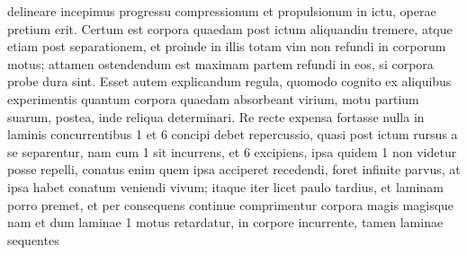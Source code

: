 %
delineare incepimus progressu compressionum et propulsionum in ictu,%
\protect{} operae pretium erit.%
%
Certum est corpora quaedam post ictum%
\protect{} aliquandiu tremere, atque etiam 
%
%
 post separationem,%
\protect{} et proinde in illis totam vim%
\protect{} non refundi in corporum motus; attamen ostendendum est maximam  
%
partem refundi in eos, si corpora probe dura%
\protect{} sint. Esset autem explicandum 
%
regula, quomodo cognito ex aliquibus experimentis%
\protect{} quantum corpora  
%
quaedam absorbeant virium,%
\protect{} motu partium%
\protect{} suarum, postea, inde reliqua 
%
%
 determinari. 
\pend
%
\pstart Re recte expensa fortasse nulla in laminis\protect{} 
%
concurrentibus 1 et 6
%
 concipi debet repercussio,%
\protect{} quasi 
%
post ictum\protect{}
%
 rursus a se separentur, nam cum 1 sit incurrens, et 6 excipiens, ipsa quidem 1 non videtur posse repelli,  
%
conatus enim quem ipsa acciperet recedendi,%
\protect{} foret infinite parvus,%
\protect{} at ipsa habet conatum veniendi%
\protect{} vivum;%
\protect{} itaque 
%
%
 iter licet paulo tardius, et %
laminam\protect{} 
%
%
porro premet, et per consequens 
%
%
continue comprimentur corpora magis magisque nam et dum laminae\protect{} 
%
 1 motus retardatur, in corpore incurrente, tamen laminae\protect{} sequentes  
